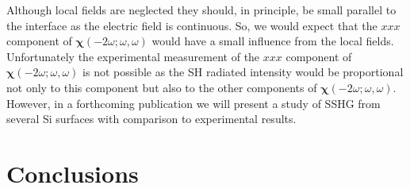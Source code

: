 \documentclass[floatfix,prb,aps,superscriptaddress,showpacs,11pt,preprint,letterpaper]{revtex4}
\begin{document}
Although local fields are neglected they should, in principle, 
be small parallel to the interface as the electric field is continuous.
So, we would expect that the $xxx$ component of 
$\boldsymbol{\chi}(-2\omega;\omega,\omega)$ would have a small influence from the local fields.
Unfortunately the experimental measurement of the $xxx$
component of $\boldsymbol{\chi}(-2\omega;\omega,\omega)$ is not possible as the SH 
radiated intensity would be proportional not only to this component 
but also to the other components of $\boldsymbol{\chi}(-2\omega;\omega,\omega)$.  
However,
in a forthcoming publication 
we will present a study of SSHG from several 
Si surfaces 
with comparison to experimental 
results. 

\section{Conclusions}\label{conc}
\end{document}
